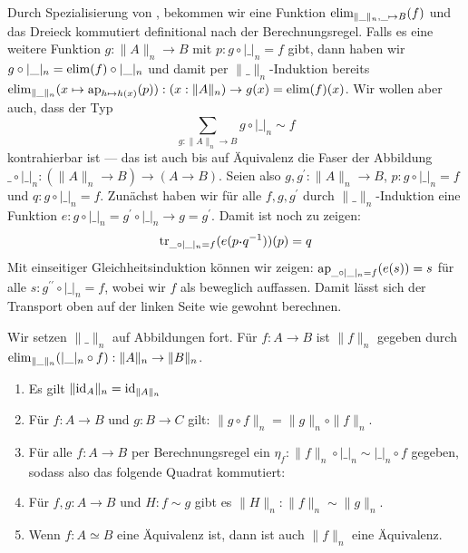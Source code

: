 \begin{beweis}
  Durch Spezialisierung von , bekommen wir eine Funktion \(\mathrm{elim}_{\|\_\|_n,\_\mapsto B}(f)\) und das Dreieck kommutiert definitional nach der Berechnungsregel. Falls es eine weitere Funktion \(g:\|A\|_n\to B\) mit \(p:g\circ |\_|_n = f\) gibt, dann haben wir \(g\circ |\_|_n= \mathrm{elim}(f)\circ  |\_|_n\) und damit per \(\|\_\|_n\)-Induktion bereits \(\mathrm{elim}_{\|\_\|_n}(x\mapsto \mathrm{ap}_{h\mapsto h(x)}(p)) : (x:\|A\|_n)\to g(x)=\mathrm{elim}(f)(x)\). Wir wollen aber auch, dass der Typ
  \[
    \sum_{g:\|A\|_n\to B}g\circ |\_|_n\sim f
  \]
  kontrahierbar ist --- das ist auch bis auf Äquivalenz die Faser der Abbildung \(\_\circ |\_|_n:(\|A\|_n\to B) \to (A\to B)\).
  Seien also \(g,g^\prime:\|A\|_n\to B\), \(p:g\circ|\_|_n=f\) und \(q:g\circ|\_|_n=f\).
  Zunächst haben wir für alle \(f,g,g^\prime\) durch \(\|\_\|_n\)-Induktion eine Funktion \(e:g\circ|\_|_n=g^\prime\circ|\_|_n\to g=g^\prime\). Damit ist noch zu zeigen:
  \[\transp_{\_\circ|\_|_n=f}(e(p\kon q^{-1}))(p)=q\]
  Mit einseitiger Gleichheitsinduktion können wir zeigen: \(\mathrm{ap}_{\_\circ|\_|_n=f}(e(s))=s\) für alle \(s:g^{\prime\prime}\circ|\_|_n=f\), wobei wir \(f\) als beweglich auffassen. Damit lässt sich der Transport oben auf der linken Seite wie gewohnt berechnen.
\end{beweis}

\begin{definition}
  Wir setzen \(\|\_\|_n\) auf Abbildungen fort.
  Für \(f:A\to B\) ist \(\|f\|_n\) gegeben durch \(\mathrm{elim}_{\|\_\|_n}(|\_|_n\circ f):\|A\|_n\to \|B\|_n\).
\end{definition}

\begin{bemerkung}
  \begin{enumerate}
  \item Es gilt \(\|\mathrm{id}_A\|_n=\mathrm{id}_{\|A\|_n}\)
  \item Für \(f:A\to B\) und \(g:B\to C\) gilt: \(\|g\circ f\|_n=\|g\|_n\circ\|f\|_n\).
  \item Für alle \(f:A\to B\) per Berechnungsregel ein \(\eta_f:\|f\|_n\circ |\_|_n\sim |\_|_n\circ f\) gegeben, sodass also das folgende Quadrat kommutiert:
    \begin{center}
    \end{center}
  \item Für \(f,g:A\to B\) und \(H:f\sim g\) gibt es \(\|H\|_n:\|f\|_n\sim\|g\|_n\).
  \item Wenn \(f:A\simeq B\) eine Äquivalenz ist, dann ist auch \(\|f\|_n\) eine Äquivalenz.
  \end{enumerate}
\end{bemerkung}


